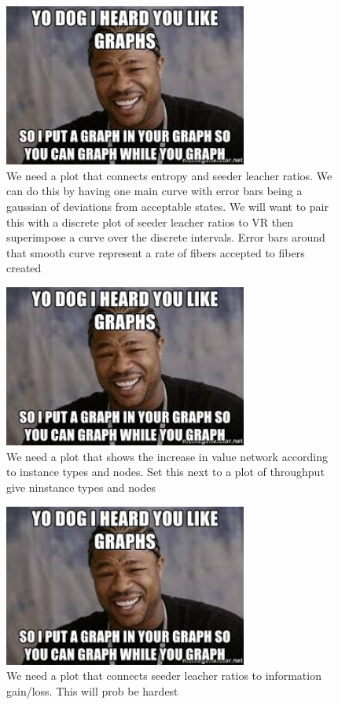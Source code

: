\documentclass{article}
\begin{document}
\begin{figure}[h]
\caption{We need a plot that connects entropy and seeder leacher ratios. We can do this by having one main curve with error bars being a gaussian of deviations from acceptable states. We will want to pair this with a discrete plot of seeder leacher ratios to VR then superimpose a curve over the discrete intervals. Error bars around that smooth curve represent a rate of fibers accepted to fibers created }
\includegraphics[width=8cm]{yo_dawg}
\centering
\end{figure}

\begin{figure}[h]
\caption{We need a plot that shows the increase in value network according to instance types and nodes. Set this next to a plot of throughput give ninstance types and nodes}
\includegraphics[width=8cm]{yo_dawg}
\centering
\end{figure}

\begin{figure}[h]
\caption{We need a plot that connects seeder leacher ratios to information gain/loss. This will prob be hardest}
\includegraphics[width=8cm]{yo_dawg}
\centering
\end{figure}


\end{document}
